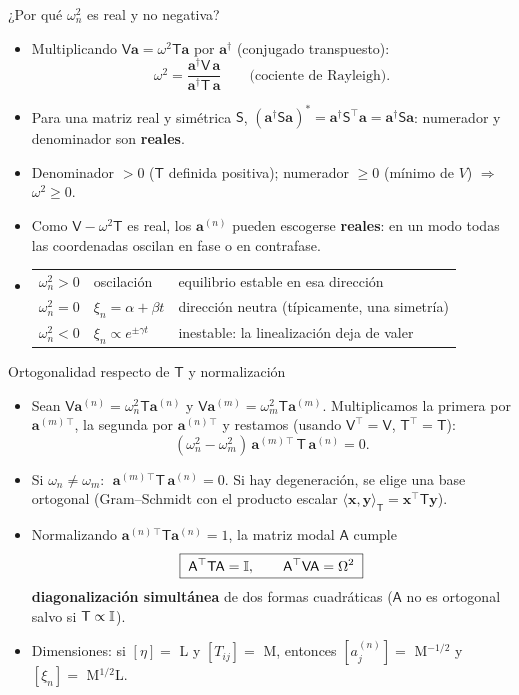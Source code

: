 \documentclass[spanish,10pt]{beamer}
\newcommand{\Tm}{\mathsf{T}}                 %
\newcommand{\Vm}{\mathsf{V}}                 %
\newcommand{\Am}{\mathsf{A}}                 %
\newcommand{\Om}{\Omega}                   %
\newcommand{\av}[1]{\mathbf{a}^{(#1)}}       %
\newcommand{\tr}{^{\top}}                    %
\begin{document}
\begin{frame}{¿Por qué $\omega_n^2$ es real y no negativa?}
\begin{itemize}[<+->]
  \item Multiplicando $\Vm\mathbf a=\omega^2\Tm\mathbf a$ por $\mathbf a^\dagger$ (conjugado transpuesto):
  \[
  \omega^2=\frac{\mathbf a^\dagger\Vm\,\mathbf a}{\mathbf a^\dagger\Tm\,\mathbf a}\qquad\text{(cociente de Rayleigh).}
  \]
  \item Para una matriz real y simétrica $\mathsf S$, $\left(\mathbf a^\dagger\mathsf S\mathbf a\right)^*=\mathbf a^\dagger\mathsf S\tr\mathbf a=\mathbf a^\dagger\mathsf S\mathbf a$: numerador y denominador son \textbf{reales}.
  \item Denominador $>0$ ($\Tm$ definida positiva); numerador $\ge0$ (mínimo de $V$) $\Rightarrow$ $\omega^2\ge0$.
  \item Como $\Vm-\omega^2\Tm$ es real, los $\av n$ pueden escogerse \textbf{reales}: en un modo todas las coordenadas oscilan en fase o en contrafase.
  \item[] \centering
  \begin{tabular}{lll}
  \toprule
  $\omega_n^2>0$ & oscilación & equilibrio estable en esa dirección\\
  $\omega_n^2=0$ & $\xi_n=\alpha+\beta t$ & dirección neutra (típicamente, una simetría)\\
  $\omega_n^2<0$ & $\xi_n\propto e^{\pm\gamma t}$ & inestable: la linealización deja de valer\\
  \bottomrule
  \end{tabular}
\end{itemize}
\end{frame}

\begin{frame}{Ortogonalidad respecto de $\Tm$ y normalización}
\begin{itemize}[<+->]
  \item Sean $\Vm\av n=\omega_n^2\Tm\av n$ y $\Vm\av m=\omega_m^2\Tm\av m$. Multiplicamos la primera por $\av m{}\tr$, la segunda por $\av n{}\tr$ y restamos (usando $\Vm\tr=\Vm$, $\Tm\tr=\Tm$):
  \[
  \left(\omega_n^2-\omega_m^2\right)\,\av m{}\tr\,\Tm\,\av n=0 .
  \]
  \item Si $\omega_n\neq\omega_m$: $\;\av m{}\tr\Tm\,\av n=0$. Si hay degeneración, se elige una base ortogonal (Gram–Schmidt con el producto escalar $\langle\mathbf x,\mathbf y\rangle_{\Tm}=\mathbf x\tr\Tm\mathbf y$).
  \item Normalizando $\av n{}\tr\Tm\av n=1$, la matriz modal $\Am$ cumple
  \[
  \boxed{\;\Am\tr\Tm\Am=\Id,\qquad \Am\tr\Vm\Am=\Om^2\;}
  \]
  \textbf{diagonalización simultánea} de dos formas cuadráticas ($\Am$ no es ortogonal salvo si $\Tm\propto\Id$).
  \item Dimensiones: si $[\eta]=$ L y $[T_{ij}]=$ M, entonces $[a_j^{(n)}]=$ M$^{-1/2}$ y $[\xi_n]=$ M$^{1/2}$L.
\end{itemize}
\end{frame}
\end{document}
